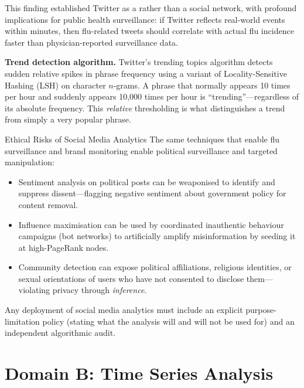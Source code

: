 This finding established Twitter as a 
rather than a social network, with profound implications for public
health surveillance: if Twitter reflects real-world events within
minutes, then flu-related tweets should correlate with actual flu
incidence faster than physician-reported surveillance data.

\textbf{Trend detection algorithm.} Twitter's trending topics algorithm
detects sudden relative spikes in phrase frequency using a variant of
Locality-Sensitive Hashing (LSH) on character $n$-grams. A phrase that
normally appears 10 times per hour and suddenly appears 10{,}000 times
per hour is ``trending''---regardless of its absolute frequency. This
\emph{relative} thresholding is what distinguishes a trend from simply
a very popular phrase.

\begin{caution}{Ethical Risks of Social Media Analytics}
The same techniques that enable flu surveillance and brand monitoring
enable political surveillance and targeted manipulation:
\begin{itemize}
  \item Sentiment analysis on political posts can be weaponised to
        identify and suppress dissent---flagging negative sentiment
        about government policy for content removal.
  \item Influence maximisation can be used by coordinated inauthentic
        behaviour campaigns (bot networks) to artificially amplify
        misinformation by seeding it at high-PageRank nodes.
  \item Community detection can expose political affiliations, religious
        identities, or sexual orientations of users who have not
        consented to disclose them---violating privacy through
        \emph{inference}.
\end{itemize}
Any deployment of social media analytics must include an explicit
purpose-limitation policy (stating what the analysis will and will not
be used for) and an independent algorithmic audit.
\end{caution}

\section{Domain B: Time Series Analysis}
\label{sec:timeseries}

